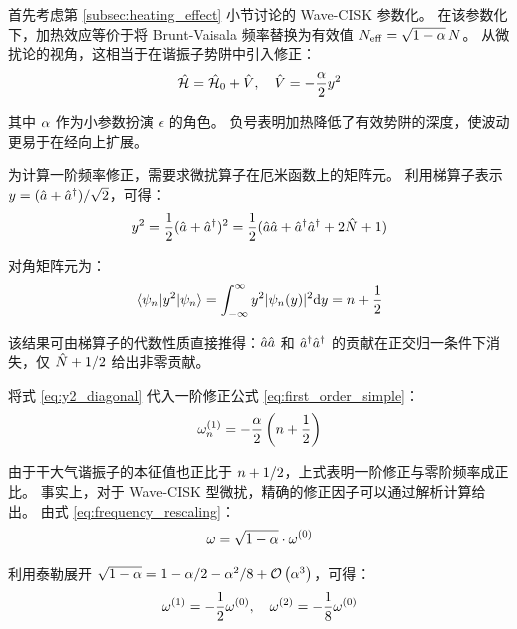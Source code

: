 首先考虑第 \ref{subsec:heating_effect} 小节讨论的 Wave-CISK 参数化。
在该参数化下，加热效应等价于将 Brunt-Vaisala 频率替换为有效值 $N_{\mathrm{eff}} = \sqrt{1-\alpha}\,N$。
从微扰论的视角，这相当于在谐振子势阱中引入修正：
\begin{equation}
    \hat{\mathcal{H}} = \hat{\mathcal{H}}_0 + \hat{V}, \quad \hat{V} = -\frac{\alpha}{2} y^2
    \label{eq:wave_cisk_perturbation}
\end{equation}

其中 $\alpha$ 作为小参数扮演 $\epsilon$ 的角色。
负号表明加热降低了有效势阱的深度，使波动更易于在经向上扩展。

为计算一阶频率修正，需要求微扰算子在厄米函数上的矩阵元。
利用梯算子表示 $y = (\hat{a} + \hat{a}^{\dagger})/\sqrt{2}$，可得：
\begin{equation}
    y^2 = \frac{1}{2}(\hat{a} + \hat{a}^{\dagger})^2 = \frac{1}{2}(\hat{a}\hat{a} + \hat{a}^{\dagger}\hat{a}^{\dagger} + 2\hat{N} + 1)
\end{equation}

对角矩阵元为：
\begin{equation}
    \langle \psi_{n} | y^2 | \psi_{n} \rangle = \int_{-\infty}^{\infty} y^2 \lvert \psi_{n}(y) \rvert^2 \mathrm{d} y = n + \frac{1}{2}
    \label{eq:y2_diagonal}
\end{equation}

该结果可由梯算子的代数性质直接推得：$\hat{a}\hat{a}$ 和 $\hat{a}^{\dagger}\hat{a}^{\dagger}$ 的贡献在正交归一条件下消失，仅 $\hat{N} + 1/2$ 给出非零贡献。

将式 \eqref{eq:y2_diagonal} 代入一阶修正公式 \eqref{eq:first_order_simple}：
\begin{equation}
    \omega^{(1)}_n = -\frac{\alpha}{2} \left( n + \frac{1}{2} \right)
    \label{eq:first_order_wave_cisk}
\end{equation}

由于干大气谐振子的本征值也正比于 $n + 1/2$，上式表明一阶修正与零阶频率成正比。
事实上，对于 Wave-CISK 型微扰，精确的修正因子可以通过解析计算给出。
由式 \eqref{eq:frequency_rescaling}：
\begin{equation}
    \omega = \sqrt{1 - \alpha} \cdot \omega^{(0)}
\end{equation}

利用泰勒展开 $\sqrt{1-\alpha} = 1 - \alpha/2 - \alpha^2/8 + \mathcal{O}\left(\alpha^3\right)$，可得：
\begin{equation}
    \omega^{(1)} = -\frac{1}{2} \omega^{(0)}, \quad \omega^{(2)} = -\frac{1}{8} \omega^{(0)}
    \label{eq:wave_cisk_corrections}
\end{equation}

